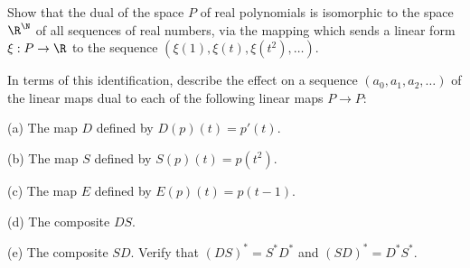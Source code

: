 \begin{problem}
Show that the dual of the space $P$ of real polynomials is isomorphic to the space $\R^\N$ of all sequences of real numbers, via the mapping which sends a linear form $\xi : P \to \R$ to the sequence $(\xi(1),\xi(t), \xi(t^2), \dots)$.

In terms of this identification, describe the effect on a sequence $(a_0, a_1, a_2, \dots)$ of the linear maps dual to each of the following linear maps $P \to P$:
\ben
\item [(a)] The map $D$ defined by $D(p)(t) = p'(t)$.
\item [(b)] The map $S$ defined by $S(p)(t) = p(t^2)$.
\item [(c)] The map $E$ defined by $E(p)(t) = p(t - 1)$.
\item [(d)] The composite $DS$.
\item [(e)] The composite $SD$.
\een
Verify that $(DS)^* = S^*D^*$ and $(SD)^* = D^*S^*$.
\end{problem}

